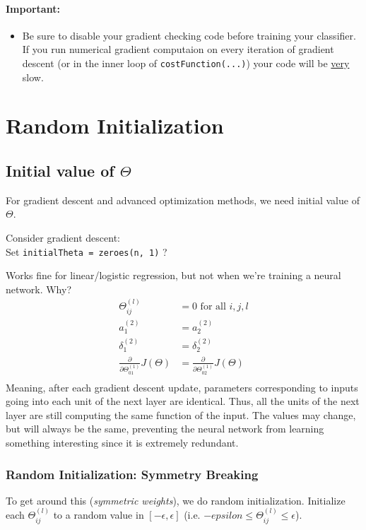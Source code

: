 \paragraph{Important:}
\begin{itemize}
	\item Be sure to disable your gradient checking code before training your
	      classifier. If you run numerical gradient computaion on every iteration of
	      gradient descent (or in the inner loop of \texttt{costFunction(...)})
	      your code will be \uline{very} slow.
\end{itemize}

\section{Random Initialization}
\subsection*{Initial value of $\Theta$}
For gradient descent and advanced optimization methods, we need initial value of
$\Theta$.

Consider gradient descent:\\
Set \texttt{initialTheta = zeroes(n, 1)} ?

Works fine for linear/logistic regression, but not when we're training a
neural network. Why?
\begin{align*}
	\Theta_{ij}^{(l)}                    & = 0 \text{ for all } i, j, l \\
	a_1^{(2)}                            & = a_2^{(2)}                  \\
	\delta_1^{(2)}                       & = \delta_2^{(2)}             \\
	\frac{\partial}
	{\partial\Theta_{01}^{(1)}}J(\Theta) & = \frac{\partial}
	{\partial\Theta_{02}^{(1)}}J(\Theta)                                \\
\end{align*}
Meaning, after each gradient descent update, parameters corresponding to inputs
going into each unit of the next layer are identical. Thus, all the units of the next
layer are still computing the same function of the input. The values may change, but
will always be the same, preventing the neural network from learning something interesting
since it is extremely redundant.

\subsubsection{Random Initialization: Symmetry Breaking}
To get around this (\emph{symmetric weights}), we do random initialization.
Initialize each $\Theta_{ij}^{(l)}$ to a random value in $[-\epsilon, \epsilon]$
(i.e. $-epsilon \leq \Theta_{ij}^{(l)} \leq \epsilon$).

